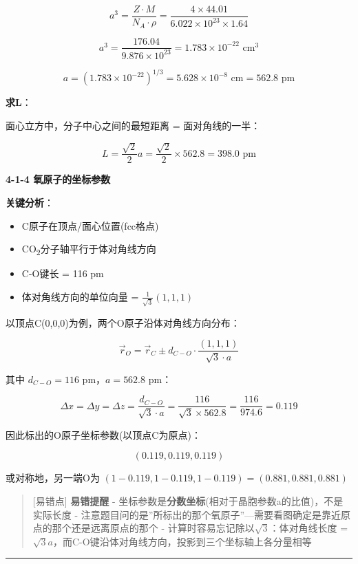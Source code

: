 \[a^3 = \frac{Z \cdot M}{N_A \cdot \rho} = \frac{4 \times 44.01}{6.022 \times 10^{23} \times 1.64}\]

\[a^3 = \frac{176.04}{9.876 \times 10^{23}} = 1.783 \times 10^{-22} \text{ cm}^3\]

\[a = (1.783 \times 10^{-22})^{1/3} = 5.628 \times 10^{-8} \text{ cm} = 562.8 \text{ pm}\]

\textbf{求L}：

面心立方中，分子中心之间的最短距离 = 面对角线的一半：

\[L = \frac{\sqrt{2}}{2}a = \frac{\sqrt{2}}{2} \times 562.8 = 398.0 \text{ pm}\]

\textbf{4-1-4 氧原子的坐标参数}

\textbf{关键分析}：

\begin{itemize}
\tightlist
\item
  C原子在顶点/面心位置(fcc格点)
\item
  CO\textsubscript{2}分子轴平行于体对角线方向
\item
  C-O键长 = 116 pm
\item
  体对角线方向的单位向量 = \(\frac{1}{\sqrt{3}}(1,1,1)\)
\end{itemize}

以顶点C(0,0,0)为例，两个O原子沿体对角线方向分布：

\[\vec{r}_O = \vec{r}_C \pm d_{C-O} \cdot \frac{(1,1,1)}{\sqrt{3} \cdot a}\]

其中 \(d_{C-O} = 116\) pm，\(a = 562.8\) pm：

\[\Delta x = \Delta y = \Delta z = \frac{d_{C-O}}{\sqrt{3} \cdot a} = \frac{116}{\sqrt{3} \times 562.8} = \frac{116}{974.6} = 0.119\]

因此标出的O原子坐标参数(以顶点C为原点)：

\[\boxed{(0.119, 0.119, 0.119)}\]

或对称地，另一端O为 \((1-0.119, 1-0.119, 1-0.119) = (0.881, 0.881, 0.881)\)

\begin{quote}
{[}易错点{]} \textbf{易错提醒}
- 坐标参数是\textbf{分数坐标}(相对于晶胞参数a的比值)，不是实际长度
- 注意题目问的是''所标出的那个氧原子''---需要看图确定是靠近原点的那个还是远离原点的那个
- 计算时容易忘记除以\(\sqrt{3}\)：体对角线长度 = \(\sqrt{3}a\)，而C-O键沿体对角线方向，投影到三个坐标轴上各分量相等
\end{quote}

\begin{center}\rule{0.5\linewidth}{0.5pt}\end{center}

